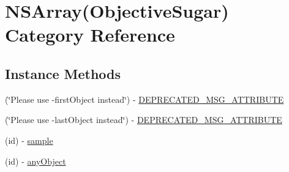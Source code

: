 \hypertarget{category_n_s_array_07_objective_sugar_08}{}\section{N\+S\+Array(Objective\+Sugar) Category Reference}
\label{category_n_s_array_07_objective_sugar_08}
\subsection*{Instance Methods}
\begin{DoxyCompactItemize}
\item 
(\char`\"{}Please use -\/first\+Object instead\char`\"{}) -\/ \hyperlink{category_n_s_array_07_objective_sugar_08_acc9c7fc287d49ed46dfaea6f2ef26a63}{D\+E\+P\+R\+E\+C\+A\+T\+E\+D\+\_\+\+M\+S\+G\+\_\+\+A\+T\+T\+R\+I\+B\+U\+T\+E}
\item 
(\char`\"{}Please use -\/last\+Object instead\char`\"{}) -\/ \hyperlink{category_n_s_array_07_objective_sugar_08_a0ff7721fa5b48dab341c630db30ec84a}{D\+E\+P\+R\+E\+C\+A\+T\+E\+D\+\_\+\+M\+S\+G\+\_\+\+A\+T\+T\+R\+I\+B\+U\+T\+E}
\item 
(id) -\/ \hyperlink{category_n_s_array_07_objective_sugar_08_ab04d291ef83fd1ad5743c50349168f2c}{sample}
\item 
\hypertarget{category_n_s_array_07_objective_sugar_08_afd40577cbc17e37d05df7a526f20a4ed}{}(id) -\/ \hyperlink{category_n_s_array_07_objective_sugar_08_afd40577cbc17e37d05df7a526f20a4ed}{any\+Object}\label{category_n_s_array_07_objective_sugar_08_afd40577cbc17e37d05df7a526f20a4ed}


\end{DoxyCompactItemize}
